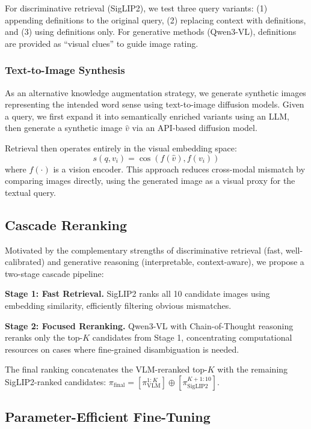 \documentclass[11pt]{article}
\begin{document}
For discriminative retrieval (SigLIP2), we test three query variants: (1) appending definitions to the original query, (2) replacing context with definitions, and (3) using definitions only. For generative methods (Qwen3-VL), definitions are provided as ``visual clues'' to guide image rating.

\subsubsection{Text-to-Image Synthesis}

As an alternative knowledge augmentation strategy, we generate synthetic images representing the intended word sense using text-to-image diffusion models. Given a query, we first expand it into semantically enriched variants using an LLM, then generate a synthetic image $\hat{v}$ via an API-based diffusion model.

Retrieval then operates entirely in the visual embedding space:
\[
    s(q, v_i) = \cos\left(f(\hat{v}), f(v_i)\right)
\]
where $f(\cdot)$ is a vision encoder. This approach reduces cross-modal mismatch by comparing images directly, using the generated image as a visual proxy for the textual query.

\subsection{Cascade Reranking}

Motivated by the complementary strengths of discriminative retrieval (fast, well-calibrated) and generative reasoning (interpretable, context-aware), we propose a two-stage cascade pipeline:

\textbf{Stage 1: Fast Retrieval.} SigLIP2 ranks all 10 candidate images using embedding similarity, efficiently filtering obvious mismatches.

\textbf{Stage 2: Focused Reranking.} Qwen3-VL with Chain-of-Thought reasoning reranks only the top-$K$ candidates from Stage 1, concentrating computational resources on cases where fine-grained disambiguation is needed.

The final ranking concatenates the VLM-reranked top-$K$ with the remaining SigLIP2-ranked candidates: $\pi_{\text{final}} = [\pi_{\text{VLM}}^{1:K}] \oplus [\pi_{\text{SigLIP2}}^{K+1:10}]$.

\subsection{Parameter-Efficient Fine-Tuning}
\end{document}
